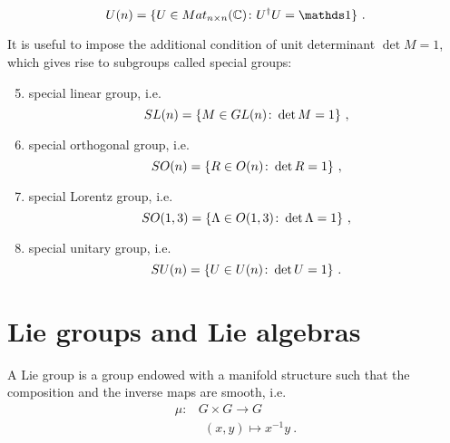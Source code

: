 \begin{example}
\begin{enumerate}
                \begin{equation*}
                    U(n) = \set{U \in Mat_{n \times n}(\mathbb C)}{U^{\dagger} U = \mathds 1} ~.
                \end{equation*}
        \end{enumerate}
        It is useful to impose the additional condition of unit determinant  $\det M = 1$, which gives rise to subgroups called special groups:
        \begin{enumerate}
        \setcounter{enumi}{4}
            \item special linear group, i.e. 
                \begin{equation*}
                    SL(n) = \{M \in GL(n)\colon\det M = 1\} ~,
                \end{equation*}
            \item special orthogonal group, i.e. 
                \begin{equation}\label{so(3)}
                    SO(n) = \{R \in O(n)\colon\det R = 1\} ~,
                \end{equation}
            \item special Lorentz group, i.e. 
                \begin{equation}\label{so(1,3)}
                    SO(1, 3) = \{\Lambda \in O(1, 3)\colon\det \Lambda = 1\} ~,
                \end{equation}
            \item special unitary group, i.e. 
                \begin{equation*}
                    SU(n) = \{U \in U(n)\colon\det U = 1\} ~.
                \end{equation*}
        \end{enumerate}
    \end{example}

\section{Lie groups and Lie algebras}

    \begin{definition}
        A Lie group is a group endowed with a manifold structure such that the composition and the inverse maps are smooth, i.e.
        \begin{equation*}
        \begin{aligned}
            \mu \colon & G \times G \rightarrow G 
            \\ & ~~ (x, y) \mapsto x^{-1} y ~.
        \end{aligned}
        \end{equation*}
    \end{definition}

